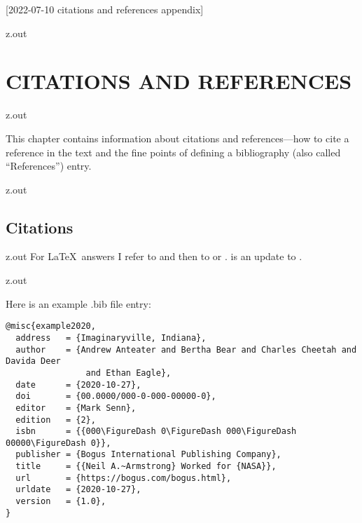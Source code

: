 [2022-07-10 citations and references appendix]

\begin{VerbatimOut}{z.out}
\chapter{CITATIONS AND REFERENCES}
\end{VerbatimOut}

\MyIO


\begin{VerbatimOut}{z.out}

This chapter contains information about citations
and references---how to cite a reference in the text
and the fine points of defining a bibliography
(also called ``References'')
entry.
\end{VerbatimOut}

\MyIO


\begin{VerbatimOut}{z.out}


\section{Citations}
\end{VerbatimOut}

\MyIO


\begin{VerbatimOut}{z.out}
For \LaTeX\ answers I refer to
\cite{lamport1994}
and then to
\cite{goossens1994}
or
\cite{kopka1999}.
\cite{kopka1999}
is an update to
\cite{kopka1995}.
\end{VerbatimOut}

\MyIO


\begin{VerbatimOut}{z.out}

Here is an example .bib file entry:

{\footnotesize
\begin{verbatim}
@misc{example2020,
  address   = {Imaginaryville, Indiana},
  author    = {Andrew Anteater and Bertha Bear and Charles Cheetah and Davida Deer
                and Ethan Eagle},
  date      = {2020-10-27},
  doi       = {00.0000/000-0-000-00000-0},
  editor    = {Mark Senn},
  edition   = {2},
  isbn      = {{000\FigureDash 0\FigureDash 000\FigureDash 00000\FigureDash 0}},
  publisher = {Bogus International Publishing Company},
  title     = {{Neil A.~Armstrong} Worked for {NASA}},
  url       = {https://bogus.com/bogus.html},
  urldate   = {2020-10-27},
  version   = {1.0},
}
\end{verbatim}
}
\end{VerbatimOut}

